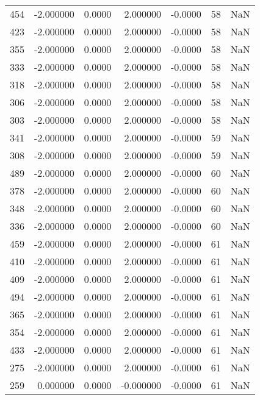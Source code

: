 \begin{tabular}{rrrrrrr}
454 &   -2.000000 &    0.0000 &    2.000000 &     -0.0000 &          58 & NaN \\
423 &   -2.000000 &    0.0000 &    2.000000 &     -0.0000 &          58 & NaN \\
355 &   -2.000000 &    0.0000 &    2.000000 &     -0.0000 &          58 & NaN \\
333 &   -2.000000 &    0.0000 &    2.000000 &     -0.0000 &          58 & NaN \\
318 &   -2.000000 &    0.0000 &    2.000000 &     -0.0000 &          58 & NaN \\
306 &   -2.000000 &    0.0000 &    2.000000 &     -0.0000 &          58 & NaN \\
303 &   -2.000000 &    0.0000 &    2.000000 &     -0.0000 &          58 & NaN \\
341 &   -2.000000 &    0.0000 &    2.000000 &     -0.0000 &          59 & NaN \\
308 &   -2.000000 &    0.0000 &    2.000000 &     -0.0000 &          59 & NaN \\
489 &   -2.000000 &    0.0000 &    2.000000 &     -0.0000 &          60 & NaN \\
378 &   -2.000000 &    0.0000 &    2.000000 &     -0.0000 &          60 & NaN \\
348 &   -2.000000 &    0.0000 &    2.000000 &     -0.0000 &          60 & NaN \\
336 &   -2.000000 &    0.0000 &    2.000000 &     -0.0000 &          60 & NaN \\
459 &   -2.000000 &    0.0000 &    2.000000 &     -0.0000 &          61 & NaN \\
410 &   -2.000000 &    0.0000 &    2.000000 &     -0.0000 &          61 & NaN \\
409 &   -2.000000 &    0.0000 &    2.000000 &     -0.0000 &          61 & NaN \\
494 &   -2.000000 &    0.0000 &    2.000000 &     -0.0000 &          61 & NaN \\
365 &   -2.000000 &    0.0000 &    2.000000 &     -0.0000 &          61 & NaN \\
354 &   -2.000000 &    0.0000 &    2.000000 &     -0.0000 &          61 & NaN \\
433 &   -2.000000 &    0.0000 &    2.000000 &     -0.0000 &          61 & NaN \\
275 &   -2.000000 &    0.0000 &    2.000000 &     -0.0000 &          61 & NaN \\
259 &    0.000000 &    0.0000 &   -0.000000 &     -0.0000 &          61 & NaN \\

\end{tabular}

